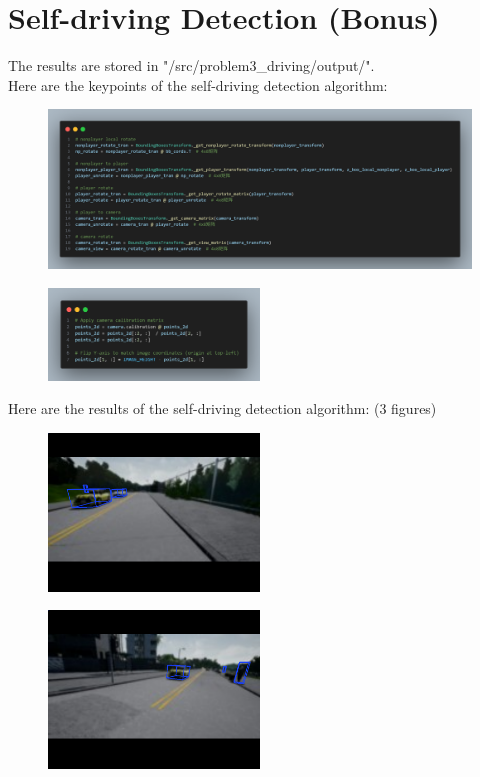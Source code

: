 \documentclass[]{article}
\begin{document}
\section{Self-driving Detection (Bonus)}
The results are stored in "/src/problem3\_driving/output/". \\
Here are the keypoints of the self-driving detection algorithm:
\begin{figure}[h]
	\centering
	\includegraphics[width=1.0\textwidth]{pre1.png}
	\caption{}
	\label{fig:self_driving_keypoints}
\end{figure}
\begin{figure}[h]
	\centering
	\includegraphics[width=0.5\textwidth]{pre2.png}
	\caption{}
	\label{fig:self_driving_3d_keypoints}
\end{figure}
\newpage
Here are the results of the self-driving detection algorithm: (3 figures)
\begin{figure}[h]
	\centering
	\includegraphics[width=0.5\textwidth]{src/problem3_driving/output/test_0.png}
	\caption{}
	\label{fig:self_driving_results_1}
\end{figure}
\begin{figure}[h]
	\centering
	\includegraphics[width=0.5\textwidth]{src/problem3_driving/output/test_1.png}
	\caption{}
	\label{fig:self_driving_results_2}
\end{figure}
\end{document}
